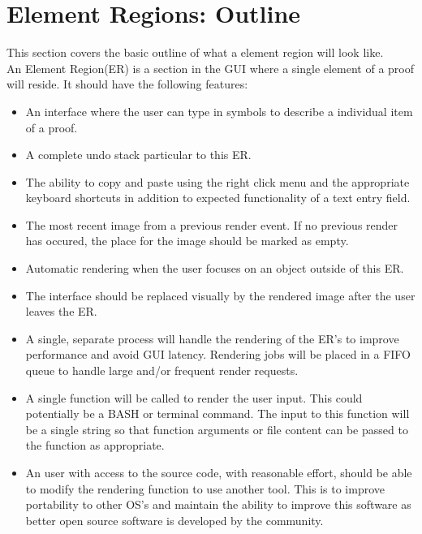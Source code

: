 \documentclass[12pt]{article}
\begin{document}
\section{Element Regions: Outline}
This section covers the basic outline of what a element region will look like.\\

An Element Region(ER) is a section in the GUI where a single element of a proof will reside. It should have the following features:
\begin{itemize}
\item An interface where the user can type in symbols to describe a individual item of a proof.
\item A complete undo stack particular to this ER.
\item The ability to copy and paste using the right click menu and the appropriate keyboard shortcuts in addition to expected functionality of a text entry field.
\item The most recent image from a previous render event. If no previous render has occured, the place for the image should be marked as empty.
\item Automatic rendering when the user focuses on an object outside of this ER.
\item The interface should be replaced visually by the rendered image after the user leaves the ER.
\item A single, separate process will handle the rendering of the ER's to improve performance and avoid GUI latency. Rendering jobs will be placed in a FIFO queue to handle large and/or frequent render requests.
\item A single function will be called to render the user input. This could potentially be a BASH or terminal command. The input to this function will be a single string so that function arguments or file content can be passed to the function as appropriate.
\item An user with access to the source code, with reasonable effort, should be able to modify the rendering function to use another tool. This is to improve portability to other OS's and maintain the ability to improve this software as better open source software is developed by the community.
\end{itemize}
\end{document}
